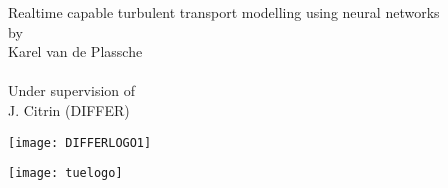 \documentclass[11pt, a4paper]{Thesis} %
\begin{document}
\begin{titlepage}
  \begin{center}
      \vspace*{2cm}
      {\huge Realtime capable turbulent transport modelling using neural networks}\\[0.5cm]
    by\\[0.3cm]
      {\large Karel van de Plassche}\\
      {\large {}}\\[0.5cm]
      Under supervision of\\
      J. Citrin (DIFFER)\\

\vspace*{\fill}
  \begin{minipage}{0.49\textwidth}
  \begin{flushleft} \large 
      \texttt{[image: DIFFERLOGO1]}
  \end{flushleft}
  \end{minipage}
%
    \begin{minipage}{0.49\textwidth}
  \begin{flushright} \large 
      \texttt{[image: tuelogo]}
  \end{flushright}
  \end{minipage}
%
  \end{center}
\end{titlepage}
\end{document}
